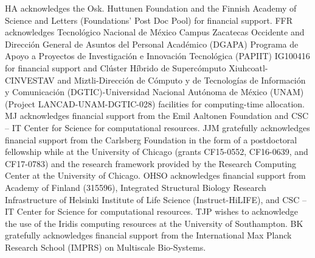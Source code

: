 \documentclass[journal=jpcbfk,manuscript=article]{achemso}
\begin{document}
\begin{acknowledgement}
  HA acknowledges the Osk. Huttunen Foundation and the Finnish Academy of Science and Letters (Foundations' Post Doc Pool) for financial support.
  FFR acknowledges Tecnol\'{o}gico Nacional de M\'{e}xico Campus Zacatecas Occidente and
  Direcci\'{o}n General de Asuntos del Personal Acad\'{e}mico (DGAPA)
  Programa de Apoyo a Proyectos de Investigaci\'{o}n e Innovaci\'{o}n
  Tecnol\'{o}gica (PAPIIT) IG100416 for financial support and Cl\'{u}ster
  H\'{i}brido de Superc\'{o}mputo Xiuhcoatl-CINVESTAV and Miztli-Direcci\'{o}n de
  C\'{o}mputo y de Tecnolog\'{i}as de Informaci\'{o}n y Comunicaci\'{o}n (DGTIC)-Universidad Nacional Aut\'{o}noma de M\'{e}xico (UNAM) (Project
  LANCAD-UNAM-DGTIC-028) facilities for computing-time allocation.
  MJ acknowledges financial support from the Emil Aaltonen Foundation
  and CSC -- IT Center for Science for computational resources.
  JJM gratefully acknowledges financial support from the Carlsberg Foundation in the form of a postdoctoral fellowship while at the University of Chicago (grants CF15-0552, CF16-0639, and CF17-0783) and the research framework provided by the Research Computing Center at the University of Chicago.
  OHSO acknowledges financial support from Academy of Finland (315596),
  Integrated Structural Biology Research Infrastructure of
  Helsinki Institute of Life Science (Instruct-HiLIFE), and
  CSC -- IT Center for Science for computational resources.
  TJP wishes to acknowledge the use of the Iridis computing resources at the University of Southampton. BK gratefully acknowledges financial support from the International Max Planck Research School (IMPRS) on Multiscale Bio-Systems. 
\end{acknowledgement}






\end{document}
